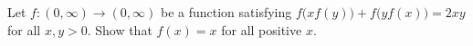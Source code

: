 Let $f:(0,\infty)\to(0,\infty)$ be a function satisfying $f\bigl(xf(y)\bigr)+f\bigl(yf(x)\bigr)=2xy$ for all $x,y>0$. Show that $f(x) = x$ for all positive $x$.